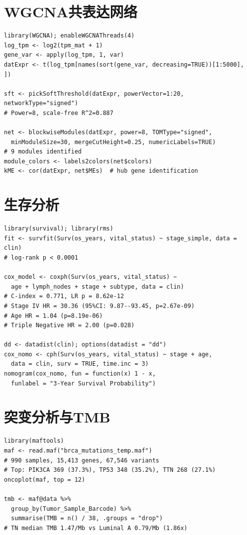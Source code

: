 \documentclass[12pt,a4paper,openany]{ctexbook}
\begin{document}
\section{WGCNA共表达网络}
\begin{lstlisting}[caption={WGCNA网络构建}, basicstyle=\ttfamily\scriptsize]
library(WGCNA); enableWGCNAThreads(4)
log_tpm <- log2(tpm_mat + 1)
gene_var <- apply(log_tpm, 1, var)
datExpr <- t(log_tpm[names(sort(gene_var, decreasing=TRUE))[1:5000], ])

sft <- pickSoftThreshold(datExpr, powerVector=1:20, networkType="signed")
# Power=8, scale-free R^2=0.887

net <- blockwiseModules(datExpr, power=8, TOMType="signed",
  minModuleSize=30, mergeCutHeight=0.25, numericLabels=TRUE)
# 9 modules identified
module_colors <- labels2colors(net$colors)
kME <- cor(datExpr, net$MEs)  # hub gene identification
\end{lstlisting}

\section{生存分析}
\begin{lstlisting}[caption={KM/Cox/Nomogram}, basicstyle=\ttfamily\scriptsize]
library(survival); library(rms)
fit <- survfit(Surv(os_years, vital_status) ~ stage_simple, data = clin)
# log-rank p < 0.0001

cox_model <- coxph(Surv(os_years, vital_status) ~
  age + lymph_nodes + stage + subtype, data = clin)
# C-index = 0.771, LR p = 8.62e-12
# Stage IV HR = 30.36 (95%CI: 9.87--93.45, p=2.67e-09)
# Age HR = 1.04 (p=8.19e-06)
# Triple Negative HR = 2.00 (p=0.028)

dd <- datadist(clin); options(datadist = "dd")
cox_nomo <- cph(Surv(os_years, vital_status) ~ stage + age,
  data = clin, surv = TRUE, time.inc = 3)
nomogram(cox_nomo, fun = function(x) 1 - x,
  funlabel = "3-Year Survival Probability")
\end{lstlisting}

\section{突变分析与TMB}
\begin{lstlisting}[caption={maftools突变分析与TMB}, basicstyle=\ttfamily\scriptsize]
library(maftools)
maf <- read.maf("brca_mutations_temp.maf")
# 990 samples, 15,413 genes, 67,546 variants
# Top: PIK3CA 369 (37.3%), TP53 348 (35.2%), TTN 268 (27.1%)
oncoplot(maf, top = 12)

tmb <- maf@data %>%
  group_by(Tumor_Sample_Barcode) %>%
  summarise(TMB = n() / 38, .groups = "drop")
# TN median TMB 1.47/Mb vs Luminal A 0.79/Mb (1.86x)
\end{lstlisting}
\end{document}
